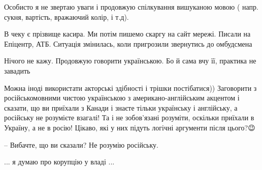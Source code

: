 \begin{itemize}
Особисто я не звертаю уваги і продовжую спілкування вишуканою мовою ( напр. сукня, вартість, вражаючий колір, і т.д).

 

В чеку є прізвище касира. Ми потім пишемо скаргу на сайт мережі. Писали на
Епіцентр, АТБ. Ситуація змінилась, коли пригрозили звернутись до омбудсмена


 
Нічого не кажу. Продовжую говорити українською. Бо й сама вчу її, практика не завадить

 

Можна іноді використати акторські здібності і трішки постібатися)) Заговорити з
російськомовними чистою українською з американо-англійським акцентом і сказати,
що ви приїхали з Канади і знаєте тільки українську і англійську, а російську не
розумієте взагалі! Та і не зобов'язані розуміти, оскільки приїхали в Україну, а
не в росію! Цікаво, які у них підуть логічні аргументи після цього?😉

 
– Вибачте, що ви сказали? Не розумію російську.

 
... я думаю про корупцію у владі ... \Smiley[1.0][yellow]


\end{itemize}
